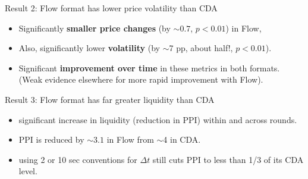 \documentclass[10pt]{beamer}
\begin{document}
\begin{frame}{Result 2: Flow format has lower price volatility than CDA}
\begin{itemize}
\item Significantly \textbf{smaller price changes} (by $\sim 0.7$, $p<0.01$) in Flow, 
\item Also, significantly lower \textbf{volatility} (by $\sim$7 pp, about half!, $p<0.01$).
\item Significant \textbf{improvement over time} in these metrics in both formats.
(Weak evidence elsewhere for more rapid improvement with Flow). 
\end{itemize}   
\end{frame}

\begin{frame}{Result 3: Flow format has far greater liquidity than CDA}
\begin{itemize}
\item significant increase in liquidity (reduction in PPI) within and across rounds.
\item PPI is reduced by $\sim 3.1 $ in Flow from $\sim$4 in CDA.
\item using 2 or 10 sec conventions for $\Delta t$ still cuts PPI to less than 1/3 of its CDA level.
\end{itemize}   
\end{frame}



\end{document}
